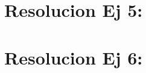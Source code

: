 \documentclass[twocolumn,aps,prl]{revtex4-1}
\begin{document}
% 
%                             
% 

\section{Resolucion Ej 5:}

% 
%                              
% 

\section{Resolucion Ej 6:}


\end{document}
